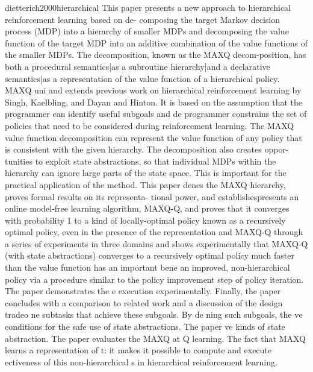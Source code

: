 dietterich2000hierarchical
This paper presents a new approach to hierarchical reinforcement learning based on de-
composing the target Markov decision process (MDP) into a hierarchy of smaller MDPs
and decomposing the value function of the target MDP into an additive combination of the value functions of the smaller MDPs. The decomposition, known as the MAXQ decom-position, has both a procedural semantics|as a subroutine hierarchy|and a declarative
semantics|as a representation of the value function of a hierarchical policy. MAXQ uni
and extends previous work on hierarchical reinforcement learning by Singh, Kaelbling, and
Dayan and Hinton. It is based on the assumption that the programmer can identify useful
subgoals and de
programmer constrains the set of policies that need to be considered during reinforcement
learning. The MAXQ value function decomposition can represent the value function of any
policy that is consistent with the given hierarchy. The decomposition also creates oppor-
tunities to exploit state abstractions, so that individual MDPs within the hierarchy can
ignore large parts of the state space. This is important for the practical application of the
method. This paper denes the MAXQ hierarchy, proves formal results on its representa-
tional power, and establishespresents an online model-free learning algorithm, MAXQ-Q, and proves that it converges
with probability 1 to a kind of locally-optimal policy known as a recursively optimal policy, even in the presence of the
representation and MAXQ-Q through a series of experiments in three domains and shows
experimentally that MAXQ-Q (with state abstractions) converges to a recursively optimal
policy much faster than the value function has an important bene
an improved, non-hierarchical policy via a procedure similar to the policy improvement
step of policy iteration. The paper demonstrates the e
execution experimentally. Finally, the paper concludes with a comparison to related work
and a discussion of the design tradeo
ne subtasks that achieve these subgoals. By de
ning such subgoals, the
ve conditions for the safe use of state abstractions. The paper
ve kinds of state abstraction. The paper evaluates the MAXQ
at Q learning. The fact that MAXQ learns a representation of
t: it makes it possible to compute and execute
ectiveness of this non-hierarchical
s in hierarchical reinforcement learning.


